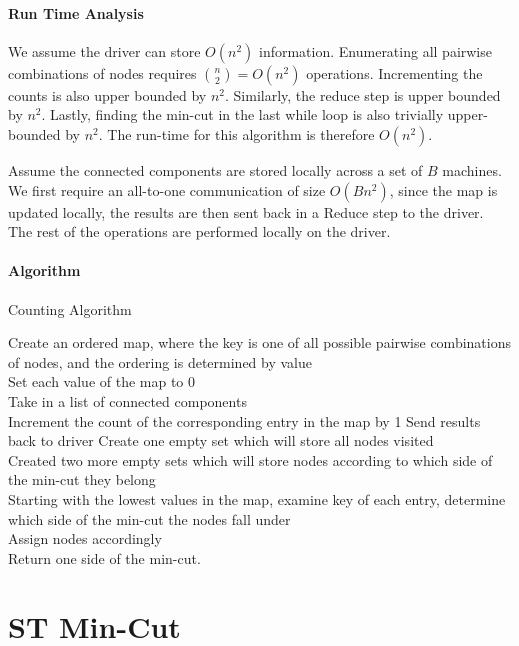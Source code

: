 \documentclass[12pt]{article}
\begin{document}
\paragraph{Run Time Analysis}
We assume the driver can store $O(n^2)$ information. Enumerating all pairwise combinations of nodes requires $\binom{n}{2} = O(n^2)$ operations. Incrementing the counts is also upper bounded by $n^2$. Similarly, the reduce step is upper bounded by $n^2$. Lastly, finding the min-cut in the last while loop is also trivially upper-bounded by $n^2$. The run-time for this algorithm is therefore $O(n^2)$.

Assume the connected components are stored locally across a set of $B$ machines. We first require an all-to-one communication of size $O(Bn^2)$, since the map is updated locally, the results are then sent back in a Reduce step to the driver. The rest of the operations are performed locally on the driver.

\paragraph{Algorithm}

\LinesNumbered
\begin{algorithm}
\caption{Counting Algorithm}
Create an ordered map, where the key is one of all possible pairwise combinations of nodes, and the ordering is determined by value \\
Set each value of the map to 0 \\
Take in a list of connected components \\
\Map
{} {
   {
    Increment the count of the corresponding entry in the map by 1
  }
}
Send results back to driver
Create one empty set which will store all nodes visited \\
Created two more empty sets which will store nodes according to which side of the min-cut they belong \\
 {
  Starting with the lowest values in the map, examine key of each entry, determine which side of the min-cut the nodes fall under \\
  Assign nodes accordingly \\ 
}
Return one side of the min-cut.
\end{algorithm}


\newpage

\section*{ST Min-Cut}
\end{document}
